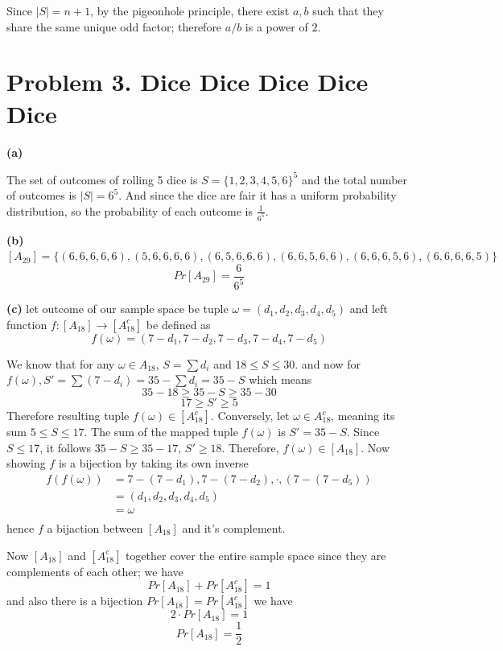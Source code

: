 \documentclass{article}
\begin{document}
Since $|S| = n + 1$, by the pigeonhole principle, there exist $a,b$ such that they share the same unique odd factor; therefore $a/b$ is a power of $2$.

\section*{Problem 3. Dice Dice Dice Dice Dice}
\textbf{(a)}

The set of outcomes of rolling 5 dice is $S = \{1,2,3,4,5,6\}^5$ and the total number of outcomes is $|S| = 6^5$. And since the dice are fair
it has a uniform probability distribution, so the probability of each outcome is $\frac{1}{6^5}$.

\vspace{\baselineskip}
\noindent\textbf{(b)}
$[A_{29}] = \{(6,6,6,6,6),(5,6,6,6,6),(6,5,6,6,6),(6,6,5,6,6),(6,6,6,5,6),(6,6,6,6,5)\}$
\[Pr[A_{29}] = \frac{6}{6^5}\]


\vspace{\baselineskip}
\noindent\textbf{(c)}
let outcome of our sample space be tuple $\omega = (d_1,d_2,d_3,d_4,d_5)$ and left function $f:[A_{18}] \rightarrow [A_{18}^c]$ be defined as
\[f(\omega) = (7 - d_1,7 - d_2, 7 - d_3, 7 - d_4, 7 - d_5) \]

We know that for any $\omega \in A_{18}$, $S = \sum d_i$ and $18 \leq S \leq 30$.
and now for $f(\omega), S' = \sum (7 - d_i) = 35 - \sum d_i = 35 - S$ which means
\[35 - 18 \geq 35 - S \geq 35 - 30\]
\[17 \geq S' \geq 5\]
Therefore resulting tuple $f(\omega) \in [A_{18}^c]$. Conversely, let $\omega \in A_{18}^c$, 
meaning its sum $5 \leq S \leq 17$. The sum of the mapped tuple $f(\omega)$ is $S' = 35 - S$. 
Since $ S \leq 17$, it follows $35 - S \geq 35 - 17$, $S' \geq 18$. Therefore, $f(\omega) \in [A_{18}]$.
Now showing $f$ is a bijection by taking its own inverse
\[
\begin{aligned}
f(f(\omega)) &= 7 - (7 - d_1),7 - (7 - d_2),\cdot,(7 - (7 - d_5))\\
&= (d_1,d_2,d_3,d_4,d_5)\\
&= \omega\\
\end{aligned}
\]
hence $f$ a bijaction between $[A_{18}]$ and it's complement.

Now $[A_{18}]$ and $[A_{18}^c]$ together cover the entire sample space since they are complements of each other; we have
\[Pr[A_{18}] + Pr[A_{18}^c] = 1\]
and also there is a bijection $Pr[A_{18}] = Pr[A_{18}^c]$ we have
\[2 \cdot Pr[A_{18}] = 1\]
\[Pr[A_{18}] = \frac{1}{2}\]
\end{document}
